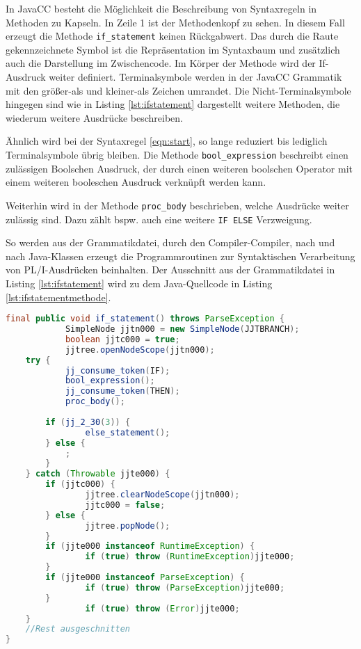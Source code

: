 In JavaCC besteht die Möglichkeit die Beschreibung von Syntaxregeln in Methoden zu Kapseln.
In Zeile 1 ist der Methodenkopf zu sehen. In diesem Fall erzeugt die Methode \verb+if_statement+ keinen Rückgabwert.
Das durch die Raute gekennzeichnete Symbol ist die Repräsentation im Syntaxbaum und zusätzlich auch die Darstellung im Zwischencode.
Im Körper der Methode wird der If-Ausdruck weiter definiert. Terminalsymbole werden in der JavaCC Grammatik mit den größer-als und kleiner-als Zeichen umrandet. Die Nicht-Terminalsymbole hingegen sind wie in Listing \ref{lst:ifstatement} dargestellt weitere Methoden, die wiederum weitere Ausdrücke beschreiben.

Ähnlich wird bei der Syntaxregel \ref{eqn:start}, so lange reduziert bis lediglich Terminalsymbole übrig bleiben.
Die Methode \verb+bool_expression+ beschreibt einen zulässigen Boolschen Ausdruck, der durch einen weiteren boolschen Operator mit einem weiteren booleschen Ausdruck verknüpft werden kann.

Weiterhin wird in der Methode \verb+proc_body+ beschrieben, welche Ausdrücke weiter zulässig sind. Dazu zählt bspw. auch eine weitere \verb+IF ELSE+ Verzweigung. 

 So werden aus der Grammatikdatei, durch den Compiler-Compiler, nach und nach Java-Klassen erzeugt die Programmroutinen zur Syntaktischen Verarbeitung von PL/I-Ausdrücken beinhalten.
Der Ausschnitt aus der Grammatikdatei in Listing \ref{lst:ifstatement} wird zu dem Java-Quellcode in Listing \ref{lst:ifstatementmethode}.


\begin{lstlisting}[language=Java, caption=Verkürzte If-Statement Methode aus dem Parser, label={lst:ifstatementmethode}]
 final public void if_statement() throws ParseException {
			SimpleNode jjtn000 = new SimpleNode(JJTBRANCH);
			boolean jjtc000 = true;
			jjtree.openNodeScope(jjtn000);
	try {
			jj_consume_token(IF);
			bool_expression();
			jj_consume_token(THEN);
			proc_body();
		
		if (jj_2_30(3)) {
				else_statement();
		} else {
			;
		}
	} catch (Throwable jjte000) {
		if (jjtc000) {
				jjtree.clearNodeScope(jjtn000);
				jjtc000 = false;
		} else {
				jjtree.popNode();
		}
		if (jjte000 instanceof RuntimeException) {
				if (true) throw (RuntimeException)jjte000;
		}
		if (jjte000 instanceof ParseException) {
				if (true) throw (ParseException)jjte000;
		}
				if (true) throw (Error)jjte000;
	}
	//Rest ausgeschnitten
}	
\end{lstlisting}

